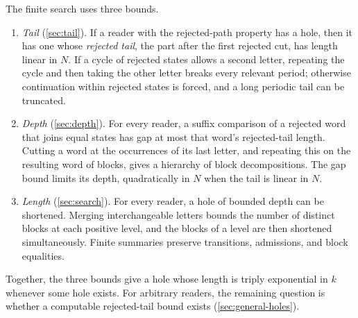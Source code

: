 The finite search uses three bounds.
\begin{enumerate}[leftmargin=*]
\item \emph{Tail} (\cref{sec:tail}). If a reader with the rejected-path
  property has a hole, then it has one whose \emph{rejected tail}, the part
  after the first rejected cut, has length linear in $N$. If a cycle of
  rejected states allows a second letter, repeating the cycle and then
  taking the other letter breaks every relevant period; otherwise
  continuation within rejected states is forced, and a long periodic tail
  can be truncated.
\item \emph{Depth} (\cref{sec:depth}). For every reader, a suffix
  comparison of a rejected word that joins equal states has gap at most
  that word's rejected-tail length. Cutting a word at the occurrences of
  its last letter, and repeating this on the resulting word of blocks,
  gives a hierarchy of block decompositions. The gap bound limits its
  depth, quadratically in $N$ when the tail is linear in $N$.
\item \emph{Length} (\cref{sec:search}). For every reader, a hole of
  bounded depth can be shortened. Merging interchangeable letters bounds
  the number of distinct blocks at each positive level, and the blocks of
  a level are then shortened simultaneously. Finite summaries preserve
  transitions, admissions, and block equalities.
\end{enumerate}
Together, the three bounds give a hole whose length is triply exponential
in $k$ whenever some hole exists. For arbitrary readers, the remaining
question is whether a computable rejected-tail bound exists
(\cref{sec:general-holes}).

